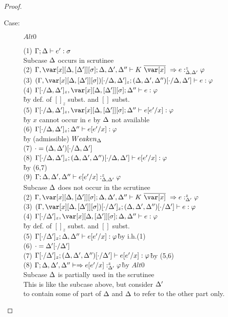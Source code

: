 \begin{proof}
\begin{description}
\item[Case:] $Alt0$
\begin{tabbing}
    (1) $\Gamma; \Delta \vdash e' : \sigma$\\
    Subcase $\Delta$ occurs in scrutinee\\
    (2) $\G,\xD; \D,\D',\D'' \vdash K~\ov{\x}~\Rightarrow e :^z_{\D,\D'} \vp$\\
    (3) $(\G,\xD)[\cdot/\D,\D']_z; (\D,\D',\D'')[\cdot/\D,\D'] \vdash e : \vp$\\
    (4) $\G[\cdot/\D,\D']_z, \xD; \D'' \vdash e : \vp$\\\`by def. of $[]_z$ subst. and $[]$ subst.\\
    (5) $\G[\cdot/\D,\D']_z, \xD; \D'' \vdash e[e'/x] : \vp$\\\`by $x$ cannot occur in $e$ by $\Delta$ not available\\
    (6) $\Gamma[\cdot/\Delta,\Delta']_z; \Delta'' \vdash e[e'/x] : \varphi$\\\`by (admissible) $Weaken_\Delta$\\
    (7) $\cdot = (\Delta,\Delta')[\cdot/\Delta,\Delta']$\\
    (8) $\Gamma[\cdot/\Delta,\Delta']_z; (\Delta,\Delta',\Delta'')[\cdot/\Delta,\Delta'] \vdash e[e'/x] : \varphi$\\\`by (6,7)\\
    (9) $\Gamma;\Delta,\Delta',\Delta'' \vdash e[e'/x] :^z_{\Delta,\Delta'} \varphi$\\
    Subcase $\Delta$ does not occur in the scrutinee\\
    (2) $\G,\xD; \D,\D',\D'' \vdash K~\ov{\x}~\Rightarrow e :^z_{\D'} \vp$\\
    (3) $(\G,\xD)[\cdot/\D']_z; (\D,\D',\D'')[\cdot/\D'] \vdash e : \vp$\\
    (4) $\G[\cdot/\D']_z, \xD; \D,\D'' \vdash e : \vp$\\\`by def. of $[]_z$ subst. and $[]$ subst.\\
    (5) $\Gamma[\cdot/\Delta']_z; \Delta,\Delta'' \vdash e[e'/x] : \varphi$\` by i.h.(1)\\
    (6) $\cdot = \Delta'[\cdot/\Delta']$\\
    (7) $\Gamma[\cdot/\Delta']_z; (\Delta,\Delta',\Delta'')[\cdot/\Delta'] \vdash e[e'/x] : \varphi$\` by (5,6)\\
    (8) $\Gamma;\Delta,\Delta',\Delta'' \vdash \Rightarrow   e[e'/x] :^z_{\Delta'} \varphi$\`by $Alt0$\\
    Subcase $\Delta$ is partially used in the scrutinee\\
    This is like the subcase above, but consider $\Delta'$\\
    to contain some of part of $\Delta$ and $\Delta$ to refer to the other part only.
\end{tabbing}


\end{description}
\end{proof}
